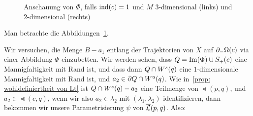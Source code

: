 \begin{bigproof}
\begin{figure}
        \caption{Anschauung von $\Phi$, falls ${ \operatorname{ind} } (c) = 1$ und $M$ $3$-dimensional 
        (links) und $2$-dimensional (rechts)}
        \label{fig: anschauung von phi}
    \end{figure}

    Man betrachte die Abbildungen~\ref{fig: anschauung von phi}.

    Wir versuchen, die Menge $B - a_1$ entlang der Trajektorien von $X$ auf ${ \partial }_- \Omega(c)$ via einer 
    Abbildung $\Phi$ einzubetten. Wir werden sehen, dass $Q = { \operatorname{Im} } (\Phi) \cup S_+(c)$ eine 
    Mannigfaltigkeit mit Rand ist, und dass dann $Q \cap { W^s } (q)$ eine $1$-dimensionale
    Mannigfaltigkeit mit Rand ist, und $a_2 \in { \partial } Q \cap { W^u } (q)$. Wie 
    in~\ref{prop: wohldefiniertheit von Lt} ist $Q \cap { W^s } (q) - a_2$ eine Teilmenge von 
    $\Lt (p, q)$, und $a_2 \in \Lt (c, q)$, wenn wir also $a_2 \in \lambda_2$ mit 
    $(\lambda_1, \lambda_2)$ identifizieren, dann bekommen wir unsere Parametrisierung 
    $\psi$ von ${\overline{\mathcal{L}} } (p, q)$. 
    Also:


\end{bigproof}
